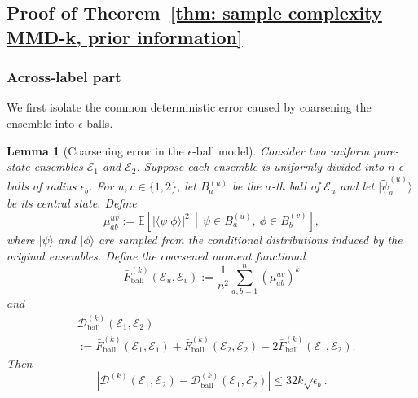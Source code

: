 \documentclass[aps,prx,reprint,superscriptaddress,amsmath,amssymb,longbibliography,floatfix]{revtex4-2}
\newcommand{\abs}[1]{\lvert #1\rvert}
\newcommand{\Abs}[1]{\left\lvert #1\right\rvert}
\providecommand{\ket}[1]{|#1 \rangle}
\providecommand{\braket}[2]{\langle #1|#2 \rangle}
\newcommand{\dsE}{\mathbb{E}}
\newcommand{\scD}{\mathcal{D}}
\newcommand{\scE}{\mathcal{E}}
\theoremstyle{plain}
\newtheorem{lemma}[theorem]{Lemma}
\theoremstyle{definition}
\theoremstyle{remark}
\begin{document}
\subsection{Proof of Theorem~\ref{thm: sample complexity MMD-k, prior information}}
\label{appsub: MMD-k prior information across-label}

\subsubsection{Across-label part}
We first isolate the common deterministic error caused by coarsening the ensemble into $\epsilon$-balls.

\begin{lemma}[Coarsening error in the $\epsilon$-ball model]
    \label{lem: coarsening error epsilon balls}
    Consider two uniform pure-state ensembles $\scE_1$ and $\scE_2$. Suppose each ensemble is uniformly divided into $n$ $\epsilon$-balls of radius $\epsilon_b$. For $u,v\in\{1,2\}$, let $B_a^{(u)}$ be the $a$-th ball of $\scE_u$ and let $\ket{\widetilde{\psi}_a^{(u)}}$ be its central state. Define
    \begin{equation}
        \mu_{ab}^{uv}
        :=
        \dsE\!\left[
            \abs{\braket{\psi}{\phi}}^2
            \,\middle|\,
            \psi\in B_a^{(u)},\ \phi\in B_b^{(v)}
        \right],
    \end{equation}
    where $\ket{\psi}$ and $\ket{\phi}$ are sampled from the conditional distributions induced by the original ensembles. Define the coarsened moment functional
    \begin{equation}
        \bar F^{(k)}_{\mathrm{ball}}(\scE_u,\scE_v)
        :=
        \frac1{n^2}\sum_{a,b=1}^n
        \left(\mu_{ab}^{uv}\right)^k
    \end{equation}
    and
    \begin{equation}
\begin{aligned}
&\scD^{(k)}_{\mathrm{ball}}(\scE_1,\scE_2)\\
        &:=
        \bar F^{(k)}_{\mathrm{ball}}(\scE_1,\scE_1)
        +
        \bar F^{(k)}_{\mathrm{ball}}(\scE_2,\scE_2)
        -
        2\bar F^{(k)}_{\mathrm{ball}}(\scE_1,\scE_2).
\end{aligned}
\end{equation}
    Then
    \begin{equation}
        \Abs{
            \scD^{(k)}(\scE_1,\scE_2)
            -
            \scD^{(k)}_{\mathrm{ball}}(\scE_1,\scE_2)
        }
        \le
        32k\sqrt{\epsilon_b}.
    \end{equation}
\end{lemma}
\end{document}
